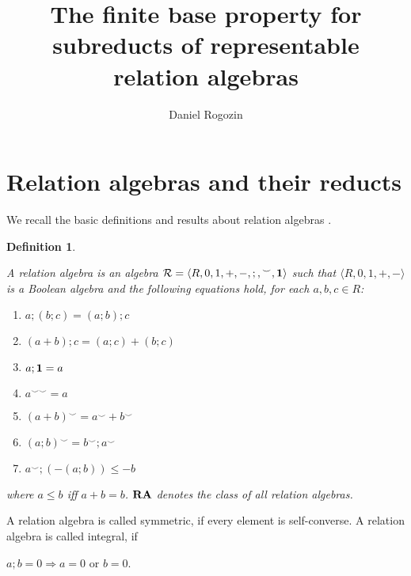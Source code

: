 \documentclass[a4paper]{article}
\author{Daniel Rogozin}
\date{}
\title{The finite base property for subreducts of representable relation algebras}
\theoremstyle{defin}
\newtheorem{defin}{Definition}
\theoremstyle{theorem}
\theoremstyle{prop}
\theoremstyle{lemma}
\theoremstyle{ex}
\theoremstyle{col}
\theoremstyle{claim}
\begin{document}
\maketitle

\section{Relation algebras and their reducts}

We recall the basic definitions and results about relation algebras \cite{hirsch2002relation} \cite{maddux2006relation}.

\begin{defin}
  $ $

    A relation algebra is an algebra $\mathcal{R} = \langle R, 0, 1, +, -, ;, {}^{\smile}, {\bf 1 }\rangle$ such that $\langle R, 0, 1, +, - \rangle$ is a Boolean algebra and the following
    equations hold, for each $a, b, c \in R$:
    \begin{enumerate}
      \item $a ; (b ; c) = (a ; b) ; c$
      \item $(a + b) ; c = (a ; c) + (b ; c)$
      \item $a ; {\bf 1} = a$
      \item $a^{\smile \smile} = a$
      \item $(a + b)^{\smile} = a^{\smile} + b^{\smile}$
      \item $(a ; b)^{\smile} = b^{\smile} ; a^{\smile}$
      \item $a^{\smile} ; (- (a ; b)) \leq - b$
    \end{enumerate}
    where $a \leq b$ iff $a + b = b$. ${\bf RA}$ denotes the class of all relation
    algebras.
\end{defin}
A relation algebra is called symmetric, if every element is self-converse. A relation algebra is called integral, if
\begin{center}
  $a ; b = 0 \Rightarrow a = 0 \text{ or } b = 0$.
\end{center}
\end{document}
